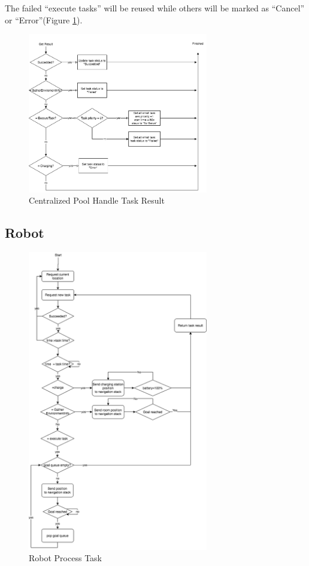 The failed ``execute tasks'' will be reused while others will be marked as ``Cancel'' or ``Error''(Figure \ref{fig:centralized_task_handle}).



\begin{figure}[htbp]
    \centering
    \includegraphics[width = 0.7\textwidth]{content/images/ch4/centralized_task_result.drawio.png}
    \caption{Centralized Pool Handle Task Result}
    \label{fig:centralized_task_handle}
\end{figure}


\subsection{Robot}

\begin{figure}[htbp]
    \centering
    \includegraphics[width = 0.7\textwidth]{content/images/ch4/robot_process_task.drawio.png}
    \caption{Robot Process Task }
    \label{fig:task_process_robot}
\end{figure}

